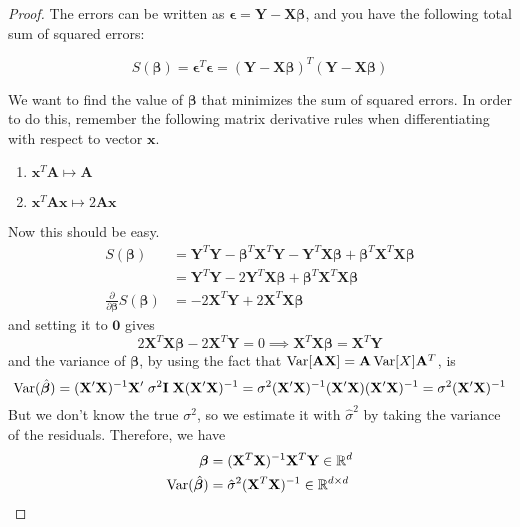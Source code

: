   \begin{proof}
    The errors can be written as $\boldsymbol{\epsilon} = \mathbf{Y} - \mathbf{X} \boldsymbol{\beta}$, and you have the following total sum of squared errors: 

    \[S(\boldsymbol{\beta}) = \boldsymbol{\epsilon}^T \boldsymbol{\epsilon} = (\mathbf{Y} - \mathbf{X} \boldsymbol{\beta})^T (\mathbf{Y} - \mathbf{X} \boldsymbol{\beta})\]

    We want to find the value of $\boldsymbol{\beta}$ that minimizes the sum of squared errors. In order to do this, remember the following matrix derivative rules when differentiating with respect to vector $\mathbf{x}$. 
    \begin{enumerate}
      \item $\mathbf{x}^T \mathbf{A} \mapsto \mathbf{A}$
      \item $\mathbf{x}^T \mathbf{A} \mathbf{x} \mapsto 2 \mathbf{A} \mathbf{x}$
    \end{enumerate}
    Now this should be easy. 
    \begin{align*}
        S(\boldsymbol{\beta}) & = \mathbf{Y}^T \mathbf{Y} - \boldsymbol{\beta}^T \mathbf{X}^T \mathbf{Y} - \mathbf{Y}^T \mathbf{X} \boldsymbol{\beta} + \boldsymbol{\beta}^T \mathbf{X}^T \mathbf{X} \boldsymbol{\beta} \\
        & = \mathbf{Y}^T \mathbf{Y} - 2 \mathbf{Y}^T \mathbf{X} \boldsymbol{\beta} + \boldsymbol{\beta}^T \mathbf{X}^T \mathbf{X} \boldsymbol{\beta} \\
        \frac{\partial}{\partial \boldsymbol{\beta}} S(\boldsymbol{\beta}) & = - 2 \mathbf{X}^T \mathbf{Y} + 2 \mathbf{X}^T \mathbf{X} \boldsymbol{\beta}
    \end{align*}
    and setting it to $\mathbf{0}$ gives 
    \[2 \mathbf{X}^T \mathbf{X} \boldsymbol{\beta} - 2 \mathbf{X}^T \mathbf{Y} = 0 \implies \mathbf{X}^T \mathbf{X} \boldsymbol{\beta} = \mathbf{X}^T \mathbf{Y}\]
    and the variance of $\boldsymbol{\beta}$, by using the fact that $\operatorname{Var}[\mathbf{A} \mathbf{X}] = \mathbf{A} \operatorname{Var}[X] \mathbf{A}^T$, is
    \[\operatorname{Var}(\hat{\boldsymbol{\beta}}) =
     (\mathbf{X}^{\prime} \mathbf{X})^{-1} \mathbf{X}^{\prime}
     \;\sigma^2 \mathbf{I} \; \mathbf{X}  (\mathbf{X}^{\prime} \mathbf{X})^{-1}
    = \sigma^2 (\mathbf{X}^{\prime} \mathbf{X})^{-1} (\mathbf{X}^{\prime}
     \mathbf{X})  (\mathbf{X}^{\prime} \mathbf{X})^{-1}
    = \sigma^2  (\mathbf{X}^{\prime} \mathbf{X})^{-1}\]
    But we don't know the true $\sigma^2$, so we estimate it with $\hat{\sigma}^2$ by taking the variance of the residuals. Therefore, we have 
    \begin{align*}
        \boldsymbol{\beta} & = (\mathbf{X}^T \mathbf{X})^{-1} \mathbf{X}^T \mathbf{Y} \in \mathbb{R}^d \\
        \operatorname{Var}(\hat{\boldsymbol{\beta}}) & = \hat{\sigma}^2 (\mathbf{X}^T \mathbf{X})^{-1} \in \mathbb{R}^{d \times d}
    \end{align*}
  \end{proof}

